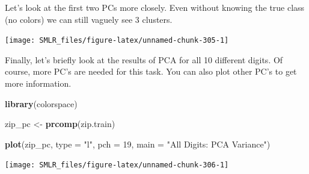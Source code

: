 \documentclass[
]{book}
\newenvironment{Shaded}{\begin{snugshade}}{\end{snugshade}}
\newcommand{\AttributeTok}[1]{\textcolor[rgb]{0.13,0.29,0.53}{#1}}
\newcommand{\DecValTok}[1]{\textcolor[rgb]{0.00,0.00,0.81}{#1}}
\newcommand{\FunctionTok}[1]{\textcolor[rgb]{0.13,0.29,0.53}{\textbf{#1}}}
\newcommand{\NormalTok}[1]{#1}
\newcommand{\OtherTok}[1]{\textcolor[rgb]{0.56,0.35,0.01}{#1}}
\newcommand{\SpecialCharTok}[1]{\textcolor[rgb]{0.81,0.36,0.00}{\textbf{#1}}}
\newcommand{\StringTok}[1]{\textcolor[rgb]{0.31,0.60,0.02}{#1}}
\theoremstyle{definition}
\theoremstyle{definition}
\theoremstyle{definition}
\theoremstyle{definition}
\theoremstyle{remark}
\begin{document}
Let's look at the first two PCs more closely. Even without knowing the true class (no colors) we can still vaguely see 3 clusters.

\begin{Shaded}
\end{Shaded}

\begin{center}\texttt{[image: SMLR\_files/figure-latex/unnamed-chunk-305-1]} \end{center}

Finally, let's briefly look at the results of PCA for all 10 different digits. Of course, more PC's are needed for this task. You can also plot other PC's to get more information.

\begin{Shaded}
\begin{Highlighting}[]
    \FunctionTok{library}\NormalTok{(colorspace)}

\NormalTok{    zip\_pc }\OtherTok{\textless{}{-}} \FunctionTok{prcomp}\NormalTok{(zip.train)}

    \FunctionTok{plot}\NormalTok{(zip\_pc, }\AttributeTok{type =} \StringTok{"l"}\NormalTok{, }\AttributeTok{pch =} \DecValTok{19}\NormalTok{, }\AttributeTok{main =} \StringTok{"All Digits: PCA Variance"}\NormalTok{)}
\end{Highlighting}
\end{Shaded}

\begin{center}\texttt{[image: SMLR\_files/figure-latex/unnamed-chunk-306-1]} \end{center}

\begin{Shaded}
\end{Shaded}
\end{document}

